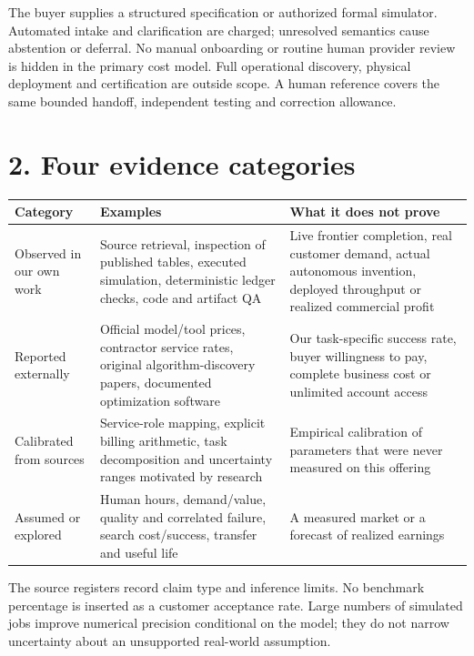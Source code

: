 \documentclass[
  10pt,
]{article}
\let\studysection\section
\renewcommand{\section}{\Needspace{7\baselineskip}\studysection}
\begin{document}
The buyer supplies a structured specification or authorized formal
simulator. Automated intake and clarification are charged; unresolved
semantics cause abstention or deferral. No manual onboarding or routine
human provider review is hidden in the primary cost model. Full
operational discovery, physical deployment and certification are outside
scope. A human reference covers the same bounded handoff, independent
testing and correction allowance.

\hypertarget{2-four-evidence-categories}{%
\section{2. Four evidence categories}\label{2-four-evidence-categories}}

\begin{longtable}[]{@{}>{\raggedright\arraybackslash}p{.22\linewidth}>{\raggedright\arraybackslash}p{.37\linewidth}>{\raggedright\arraybackslash}p{.35\linewidth}@{}}
\toprule\noalign{}
Category & Examples & What it does not prove \\
\midrule\noalign{}
\endhead
\bottomrule\noalign{}
\endlastfoot
Observed in our own work & Source retrieval, inspection of published
tables, executed simulation, deterministic ledger checks, code and
artifact QA & Live frontier completion, real customer demand, actual
autonomous invention, deployed throughput or realized commercial
profit \\
Reported externally & Official model/tool prices, contractor service
rates, original algorithm-discovery papers, documented optimization
software & Our task-specific success rate, buyer willingness to pay,
complete business cost or unlimited account access \\
Calibrated from sources & Service-role mapping, explicit billing
arithmetic, task decomposition and uncertainty ranges motivated by
research & Empirical calibration of parameters that were never measured
on this offering \\
Assumed or explored & Human hours, demand/value, quality and correlated
failure, search cost/success, transfer and useful life & A measured
market or a forecast of realized earnings \\
\end{longtable}

The source registers record claim type and inference limits. No
benchmark percentage is inserted as a customer acceptance rate. Large
numbers of simulated jobs improve numerical precision conditional on the
model; they do not narrow uncertainty about an unsupported real-world
assumption.
\end{document}
